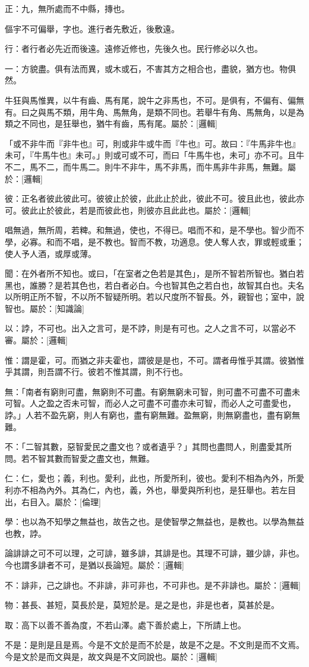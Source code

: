 \begin{pinyinscope}
正：九，無所處而不中縣，摶也。

傴宇不可偏舉，字也。進行者先敷近，後敷遠。

行：者行者必先近而後遠。遠修近修也，先後久也。民行修必以久也。

一：方貌盡。俱有法而異，或木或石，不害其方之相合也，盡貌，猶方也。物俱然。

牛狂與馬惟異，以牛有齒、馬有尾，說牛之非馬也，不可。是俱有，不偏有、偏無有。曰之與馬不類，用牛角、馬無角，是類不同也。若舉牛有角、馬無角，以是為類之不同也，是狂舉也，猶牛有齒，馬有尾。屬於：[邏輯]

「或不非牛而『非牛也』可，則或非牛或牛而『牛也』可。故曰：『牛馬非牛也』未可，『牛馬牛也』未可。」則或可或不可，而曰「牛馬牛也，未可」亦不可。且牛不二，馬不二，而牛馬二。則牛不非牛，馬不非馬，而牛馬非牛非馬，無難。屬於：[邏輯]

彼：正名者彼此彼此可。彼彼止於彼，此此止於此，彼此不可。彼且此也，彼此亦可。彼此止於彼此，若是而彼此也，則彼亦且此此也。屬於：[邏輯]

唱無過，無所周，若粺。和無過，使也，不得已。唱而不和，是不學也。智少而不學，必寡。和而不唱，是不教也。智而不教，功適息。使人奪人衣，罪或輕或重；使人予人酒，或厚或薄。

聞：在外者所不知也。或曰，「在室者之色若是其色」，是所不智若所智也。猶白若黑也，誰勝？是若其色也，若白者必白。今也智其色之若白也，故智其白也。夫名以所明正所不智，不以所不智疑所明。若以尺度所不智長。外，親智也；室中，說智也。屬於：[知識論]

以：誖，不可也。出入之言可，是不誖，則是有可也。之人之言不可，以當必不審。屬於：[邏輯]

惟：謂是霍，可。而猶之非夫霍也，謂彼是是也，不可。謂者毋惟乎其謂。彼猶惟乎其謂，則吾謂不行。彼若不惟其謂，則不行也。

無：「南者有窮則可盡，無窮則不可盡。有窮無窮未可智，則可盡不可盡不可盡未可智。人之盈之否未可智，而必人之可盡不可盡亦未可智，而必人之可盡愛也，誖。」人若不盈先窮，則人有窮也，盡有窮無難。盈無窮，則無窮盡也，盡有窮無難。

不：「二智其數，惡智愛民之盡文也？或者遺乎？」其問也盡問人，則盡愛其所問。若不智其數而智愛之盡文也，無難。



仁：仁，愛也；義，利也。愛利，此也，所愛所利，彼也。愛利不相為內外，所愛利亦不相為內外。其為仁，內也，義，外也，舉愛與所利也，是狂舉也。若左目出，右目入。屬於：[倫理]

學：也以為不知學之無益也，故告之也。是使智學之無益也，是教也。以學為無益也教，誖。

論誹誹之可不可以理，之可誹，雖多誹，其誹是也。其理不可誹，雖少誹，非也。今也謂多誹者不可，是猶以長論短。屬於：[邏輯]

不：誹非，己之誹也。不非誹，非可非也，不可非也。是不非誹也。屬於：[邏輯]

物：甚長、甚短，莫長於是，莫短於是。是之是也，非是也者，莫甚於是。

取：高下以善不善為度，不若山澤。處下善於處上，下所請上也。

不是：是則是且是焉。今是不文於是而不於是，故是不之是。不文則是而不文焉。今是文於是而文與是，故文與是不文同說也。屬於：[邏輯]


\end{pinyinscope}